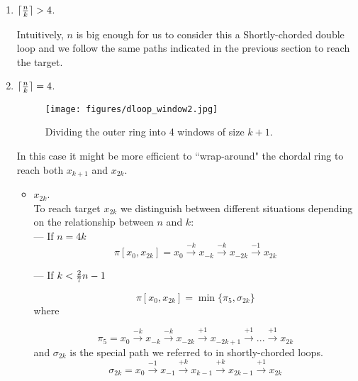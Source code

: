 \begin{enumerate}

\item  $\lceil {n \over k} \rceil >  4$.

 Intuitively,   $n$  is big enough for us to consider this a Shortly-chorded double loop and we follow the same paths indicated in the previous section to reach the target.


\item  $\lceil {n \over k} \rceil=  4$.

\begin{figure}[H]
  \centering  
  \texttt{[image: figures/dloop\_window2.jpg]}
  \caption{Dividing the outer ring into 4 windows of size $k+1$.}\label{fig:dloop-window}
\end{figure}

 
 In this case it might be  more efficient to ``wrap-around" the chordal ring to reach  both  $x_{k+1}$ and $x_{2k}$.
      
  \begin{itemize}    
\item $x_{2k}$. \\
To reach target $x_{2k}$ we distinguish between different situations depending on the relationship
 between $n$ and $k$: \\
--- If $n=4k$
 $$ \pi[x_0,x_{2k}]  = x_{0} \xrightarrow {-k} x_{-k} \xrightarrow {-k} x_{-2k} \xrightarrow {-1} x_{2k}$$

---  If   $k < {2\over7}n-1$

$$ \pi[x_0,x_{2k}] = \min \{ \pi_5, \sigma_{2k}\}$$
where

$$ \pi_5 = x_{0} \xrightarrow {-k} x_{-k} \xrightarrow {-k} x_{-2k} \xrightarrow {+1} x_{-2k+1}\xrightarrow {+1} ... \xrightarrow {+1} x_{2k}$$
and $ \sigma_{2k}$ is the special path we referred to in shortly-chorded loops.
$$ \sigma_{2k}=   x_{0} \xrightarrow {-1} x_{-1} \xrightarrow {+k} x_{k-1} \xrightarrow {+k} x_{2k-1}
 \xrightarrow {+1}  x_{2k}$$


\end{itemize}
\end{enumerate}
